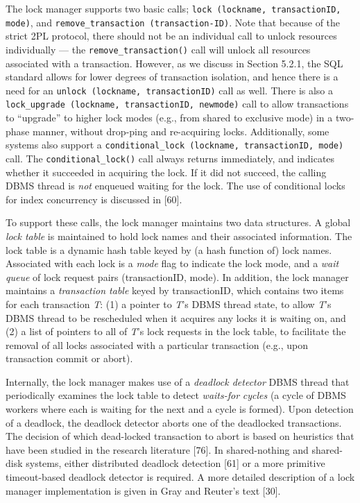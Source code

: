 \documentclass[a4paper,11pt,twoside,openright]{book}
\begin{document}
The lock manager supports two basic calls; \texttt{lock (lockname,
transactionID, mode)}, and \texttt{remove\_transaction (transaction-ID)}. Note that
because of the strict 2PL protocol, there should not be an individual
call to unlock resources individually --- the \texttt{remove\_transaction()} call
will unlock all resources associated with a transaction. However, as we
discuss in Section 5.2.1, the SQL standard allows for lower degrees of
transaction isolation, and hence there is a need for an \texttt{unlock
(lockname, transactionID)} call as well. There is also a \texttt{lock\_upgrade
(lockname, transactionID, newmode)} call to allow transactions to
``upgrade'' to higher lock modes (e.g., from shared to exclusive mode)
in a two-phase manner, without drop-ping and re-acquiring locks.
Additionally, some systems also support a \texttt{conditional\_lock (lockname,
transactionID, mode)} call. The \texttt{conditional\_lock()} call always returns
immediately, and indicates whether it succeeded in acquiring the lock.
If it did not succeed, the calling DBMS thread is \emph{not} enqueued
waiting for the lock. The use of conditional locks for index concurrency
is discussed in {[}60{]}.

To support these calls, the lock manager maintains two data structures.
A global \emph{lock table} is maintained to hold lock names and their
associated information. The lock table is a dynamic hash table keyed by
(a hash function of) lock names. Associated with each lock is a
\emph{mode} flag to indicate the lock mode, and a \emph{wait queue} of
lock request pairs (transactionID, mode). In addition, the lock manager
maintains a \emph{transaction table} keyed by transactionID, which
contains two items for each transaction \emph{T}: (1) a pointer to
\emph{T}'s DBMS thread state, to allow \emph{T}'s DBMS thread to be
rescheduled when it acquires any locks it is waiting on, and (2) a list
of pointers to all of \emph{T}'s lock requests in the lock table, to
facilitate the removal of all locks associated with a particular
transaction (e.g., upon transaction commit or abort).

Internally, the lock manager makes use of a \emph{deadlock detector}
DBMS thread that periodically examines the lock table to detect
\emph{waits-for} \emph{cycles} (a cycle of DBMS workers where each is
waiting for the next and a cycle is formed). Upon detection of a
deadlock, the deadlock detector aborts one of the deadlocked
transactions. The decision of which dead-locked transaction to abort is
based on heuristics that have been studied in the research literature
{[}76{]}. In shared-nothing and shared-disk systems, either distributed
deadlock detection {[}61{]} or a more primitive timeout-based deadlock
detector is required. A more detailed description of a lock manager
implementation is given in Gray and Reuter's text {[}30{]}.
\end{document}
